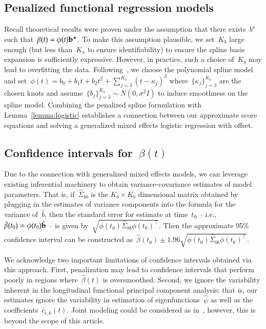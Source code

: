 \documentclass[11pt]{amsart}
\begin{document}
\subsection{Penalized functional regression models}

Recall theoretical results were proven under the assumption that there exists~$b^\star$ such that~$\beta(t) = \phi(t) {\bf b}^\star$. To make this assumption plausible, we set~$K_b$ large enough (but less than~$K_x$ to ensure identifiability) to ensure the spline basis expansion is sufficiently expressive. However, in practice, such a choice of~$K_b$ may lead to overfitting the data. Following~\cite{Goldsmith2011}, we choose the polynomial spline model and set~$\phi(t) = b_0 + b_1 t + b_2 t^2 + \sum_{j=3}^{K_b} (t-\kappa_j)^3$ where~$\{ \kappa_j \}_{j=3}^{K_b}$ are the chosen knots and assume~$\{ b_j \}_{j=3}^{K_b} \sim N(0, \sigma^2 I)$ to induce smoothness on the spline model.  Combining the penalized spline formulation with Lemma~\ref{lemma:logistic} establishes a connection between our approximate score equations and solving a generalized mixed effects logistic regression with offset.

\subsection{Confidence intervals for~$\beta(t)$}

Due to the connection with generalized mixed effects models, we can leverage existing inferential machinery to obtain variance-covariance estimates of model parameters. That is, if~$\hat \Sigma_{bb}$ is the $K_b \times K_b$ dimensional matrix obtained by plugging in the estimates of variance components into the formula for the variance of~$\hat b$, then the standard error for estimate at time~$t_0$ -- i.e., ~$\hat \beta (t_0) = \phi(t_0) \hat {\bf b}$ -- is given by~$\sqrt{ \phi (t_0 ) \hat \Sigma_{bb} \phi(t_0)^\top}$.  Then the approximate 95\% confidence interval can be constructed as~$\hat \beta (t_0) \pm 1.96 \sqrt{\phi (t_0) \hat \Sigma_{bb} \phi(t_0)^\top}$.

We acknowledge two important limitations of confidence intervals obtained via this approach. First, penalization may lead to confidence intervals that perform poorly in regions where~$\hat \beta(t)$ is oversmoothed. Second, we ignore the variability inherent in the longitudinal functional principal component analysis; that is, our estimates ignore the variability in estimation of eigenfunctions~$\hat \psi$ as well as the coefficients~$\hat c_{i,k}(t)$. Joint modeling could be considered as in~\cite{Crainiceanu2010}, however, this is beyond the scope of this article.
\end{document}
